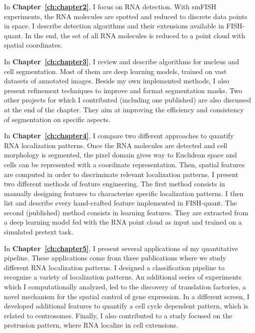 In \textbf{Chapter~\ref{ch:chapter2}}, I focus on \ac{RNA} detection.
With \ac{smFISH} experiments, the \ac{RNA} molecules are spotted and reduced to discrete data points in space.
I describe detection algorithms and their extensions available in FISH-quant.
In the end, the set of all \ac{RNA} molecules is reduced to a point cloud with spatial coordinates.

In \textbf{Chapter~\ref{ch:chapter3}}, I review and describe algorithms for nucleus and cell segmentation.
Most of them are deep learning models, trained on vast datasets of annotated images.
Beside my own implemented methods, I also present refinement techniques to improve and format segmentation masks.
Two other projects for which I contributed (including one published) are also discussed at the end of the chapter.
They aim at improving the efficiency and consistency of segmentation on specific aspects.

In \textbf{Chapter~\ref{ch:chapter4}}, I compare two different approaches to quantify \ac{RNA} localization patterns.
Once the \ac{RNA} molecules are detected and cell morphology is segmented, the pixel domain gives way to Euclidean space and cells can be represented with a coordinate representation.
Then, spatial features are computed in order to discriminate relevant localization patterns.
I present two different methods of feature engineering.
The first method consists in manually designing features to characterize specific localization patterns.
I then list and describe every hand-crafted feature implemented in FISH-quant.
The second (published) method consists in learning features.
They are extracted from a deep learning model fed with the \ac{RNA} point cloud as input and trained on a simulated pretext task.

In \textbf{Chapter~\ref{ch:chapter5}}, I present several applications of my quantitative pipeline.
These applications come from three publications where we study different \ac{RNA} localization patterns.
I designed a classification pipeline to recognize a variety of localization patterns.
An additional series of experiments which I computationally analyzed, led to the discovery of translation factories, a novel mechanism for the spatial control of gene expression. 
In a different screen, I developed additional features to quantify a cell cycle dependent pattern, which is related to centrosomes.
Finally, I also contributed to a study focused on the protrusion pattern, where \ac{RNA} localize in cell extensions.